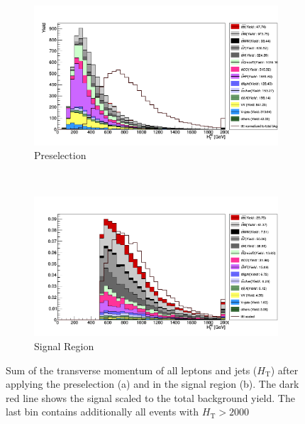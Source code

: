\begin{figure}[H]
\begin{subfigure}{\textwidth}
  \centering
  \includegraphics[width=.95\linewidth]{figs/HT_presection.png}
  \caption{Preselection}
  \label{fig:HT_preselection}
\end{subfigure} \\
\begin{subfigure}{\textwidth}
  \centering
  \includegraphics[width=.95\linewidth]{figs/HT_sr.png}
  \caption{Signal Region}
  \label{fig:HT_sr}
\end{subfigure}
\caption{Sum of the transverse momentum of all leptons and jets ($H_{\text{T}}$) after applying the preselection (a) and in the signal region (b). The dark red line shows the signal scaled to the total background yield. The last bin contains additionally all events with $H_{\text{T}} > 2000$}
\label{fig:HTSR}
\end{figure}